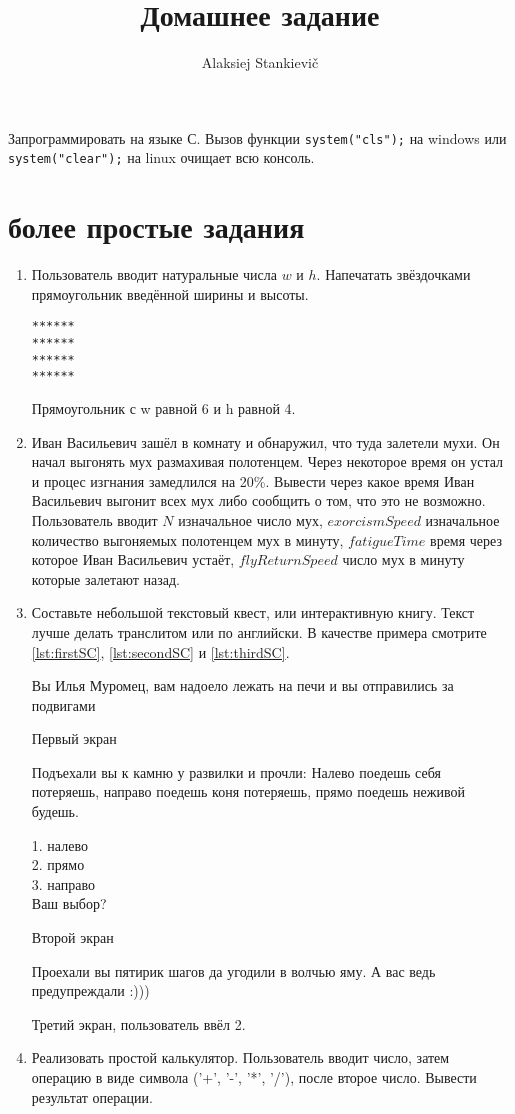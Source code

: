 \documentclass[12pt]{article}
\author{Alaksiej Stankievič}
\title{Домашнее задание}
\begin{document}

 Запрограммировать на языке С. Вызов функции \verb|system("cls");| на windows или \verb|system("clear");| на  linux очищает всю консоль.
 \section{более простые задания}
 \begin{enumerate}
  \item Пользователь вводит натуральные числа $w$ и $h$. Напечатать звёздочками прямоугольник введённой ширины и высоты.
  \begin{listing}[H]
\begin{center}
\begin{verbatim}
******
******
******
******
\end{verbatim}
\end{center}

\caption{Прямоугольник с w равной 6 и h равной 4.}
\end{listing}
  \item Иван Васильевич зашёл в комнату и обнаружил, что туда залетели мухи. Он начал выгонять мух размахивая полотенцем. Через некоторое время он устал и процес изгнания замедлился на 20\%. Вывести через какое время Иван Васильевич выгонит всех мух либо сообщить о том, что это не возможно. Пользователь вводит $N$ изначальное число мух, $exorcismSpeed$ изначальное количество выгоняемых полотенцем мух в минуту, $fatigueTime$ время через которое Иван Васильевич устаёт, $flyReturnSpeed$ число мух в минуту которые залетают назад.
  \item Составьте небольшой текстовый квест, или интерактивную книгу. Текст лучше делать транслитом или по английски. В качестве примера смотрите \ref{lst:firstSC}, \ref{lst:secondSC} и \ref{lst:thirdSC}.
    \begin{listing}[H]
Вы Илья Муромец, вам надоело лежать на печи и вы отправились за подвигами
\caption{Первый экран}
\label{lst:firstSC}
\end{listing}
\begin{listing}[H]
Подъехали вы к камню у развилки и прочли:
Налево поедешь себя потеряешь, направо поедешь коня потеряешь,
прямо поедешь неживой будешь.

1. налево\\
2. прямо\\
3. направо\\
Ваш выбор?
\caption{Второй экран}
\label{lst:secondSC}
\end{listing}
\begin{listing}[H]
Проехали вы пятирик шагов да угодили в волчью яму. А вас ведь предупреждали :)))
\caption{Третий экран, пользователь ввёл 2.}
\label{lst:thirdSC}
\end{listing}
  \item Реализовать простой калькулятор. Пользователь вводит число, затем операцию в виде символа ('+', '-', '*', '/'), после второе число. Вывести результат операции.
 \end{enumerate}
 
\end{document}
